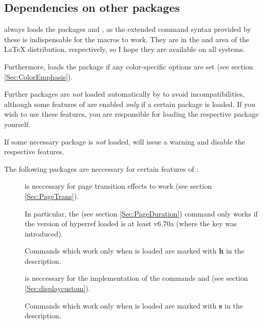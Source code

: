\newslide

\subsection{Dependencies on other packages}
 always loads the packages  and , as the extended command syntax provided by
these is indispensable for the macros to work. They are in the  and  area of the \LaTeX{}
distribution, respectively, so I hope they are available on all systems.

Furthermore,  loads the package  if any color-specific options are set (see section
\ref{Sec:ColorEmphasis}).

Further packages are \emph{not} loaded automatically by  to avoid incompatibilities, although some
features of  are enabled \emph{only} if a certain package is loaded. If you wish to use these features,
you are responsible for loading the respective package yourself. 

If some necessary package is \emph{not} loaded,  will issue a warning and disable the respective
features.

The following packages are neccessary for certain features of :
\begin{description}
\item[] is neccessary for page transition effects to work (see section
  \ref{Sec:PageTrans}). 
  
  In particular, the  (see section \ref{Sec:PageDuration}) command only works if the version of
  hyperref loaded is at least v6.70a (where the  key was introduced).
  
  Commands which work only when  is loaded are marked with \textbf{\textsf{h}} in the description.
  
\newslide

\item[] is neccessary for the implementation of the commands  and
   (see section \ref{Sec:displaycustom}).
  
  Commands which work only when  is loaded are marked with \textbf{\textsf{s}} in the description.
\end{description}

\newslide

